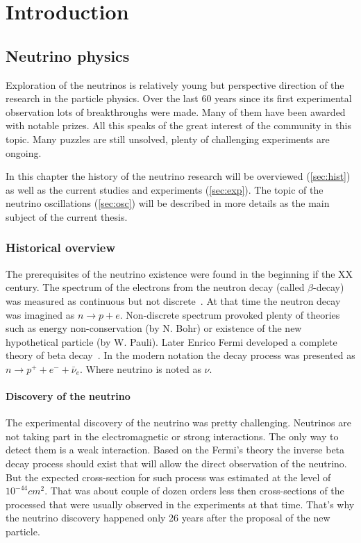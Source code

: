 \documentclass[../main.tex]{subfiles}
\begin{document}
\renewcommand{\labelitemi}{\ding{226}}
\renewcommand{\labelitemii}{\ding{227}}


\part{Introduction}
\label{part:intro:general}

\chapter{Neutrino physics}
Exploration of the neutrinos is relatively young but perspective direction of the research in the particle physics. Over the last 60 years since its first experimental observation lots of breakthroughs were made. Many of them have been awarded with notable prizes. All this speaks of the great interest of the community in this topic. Many puzzles are still unsolved, plenty of challenging experiments are ongoing.

In this chapter the history of the neutrino research will be overviewed (\autoref{sec:hist}) as well as the current studies and experiments (\autoref{sec:exp}). The topic of the neutrino oscillations (\autoref{sec:osc}) will be described in more details as the main subject of the current thesis.

\section{Historical overview}
\label{sec:hist}
The prerequisites of the neutrino existence were found in the beginning if the XX century. The spectrum of the electrons from the neutron decay (called $\beta$-decay) was measured as continuous but not discrete~\cite{Chadwick1914}. At that time the neutron decay was imagined as $n\to p+e$. Non-discrete spectrum provoked plenty of theories such as energy non-conservation (by N. Bohr) or existence of the new hypothetical particle (by W. Pauli). Later Enrico Fermi developed a complete theory of beta decay~\cite{Fermi1934}. In the modern notation the decay process was presented as $n\to p^++e^-+\bar{\nu}_e$. Where neutrino is noted as $\nu$.

\subsection{Discovery of the neutrino}
The experimental discovery of the neutrino was pretty challenging. Neutrinos are not taking part in the electromagnetic or strong interactions. The only way to detect them is a weak interaction. Based on the Fermi's theory the inverse beta decay process should exist that will allow the direct observation of the neutrino. But the expected cross-section for such process was estimated at the level of $10^{-44} cm^2$. That was about couple of dozen orders less then cross-sections of the processed that were usually observed in the experiments at that time. That's why the neutrino discovery happened only 26 years after the proposal of the new particle.
\end{document}
